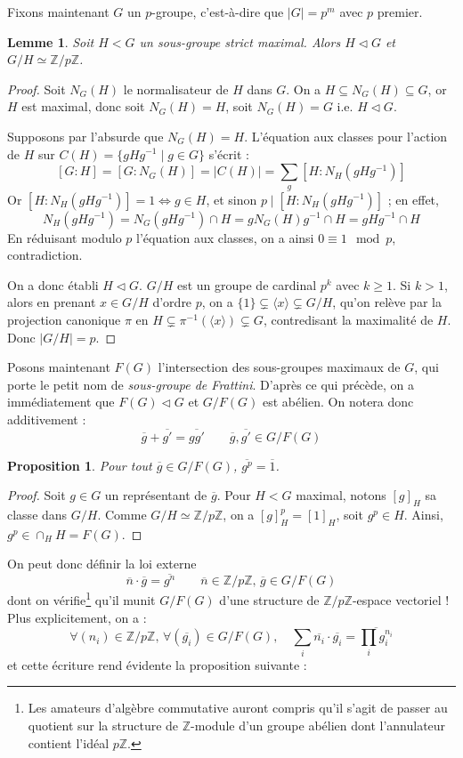 \documentclass[a4paper, 11pt]{article}
\def\Z{\mathbb{Z}}
\newtheorem*{proposition}{Proposition}
\newtheorem*{lemma}{Lemme}
\begin{document}
Fixons maintenant $G$ un $p$-groupe, c'est-à-dire que $|G| = p^m$ avec $p$
premier.

\begin{lemma}
  Soit $H < G$ un sous-groupe strict \emph{maximal}. Alors $H \triangleleft G$
  et $G/H \simeq \Z/p\Z$.
\end{lemma}
\begin{proof}
  Soit $N_G(H)$ le normalisateur de $H$ dans $G$. On a $H \subseteq N_G(H)
  \subseteq G$, or $H$ est maximal, donc soit $N_G(H) = H$, soit $N_G(H) = G$
  i.e. $H \triangleleft G$.

  Supposons par l'absurde que $N_G(H) = H$. L'équation aux classes pour l'action
  de $H$ sur $C(H) = \{gHg^{-1} \mid g \in G\}$ s'écrit :
  \[ [G : H] = [G : N_G(H)] = |C(H)| = \sum_g [H : N_H(gHg^{-1})] \]
  Or $[H : N_H(gHg^{-1})] = 1 \Leftrightarrow g \in H$, et sinon $p \mid [H :
  N_H(gHg^{-1})]$ ; en effet,
  \[ N_H(gHg^{-1}) = N_G(gHg^{-1}) \cap H = g N_G(H) g^{-1} \cap H = gHg^{-1}
  \cap H \]
  En réduisant modulo $p$ l'équation aux classes, on a ainsi $0 \equiv 1 \mod
  p$, contradiction.

  On a donc établi $H \triangleleft G$. $G/H$ est un groupe de cardinal $p^k$
  avec $k \geq 1$. Si $k > 1$, alors en prenant $x \in G/H$ d'ordre $p$, on a
  $\{1\} \subsetneq \langle x \rangle \subsetneq G/H$, qu'on relève par la
  projection canonique $\pi$ en $H \subsetneq \pi^{-1}(\langle x \rangle)
  \subsetneq G$, contredisant la maximalité de $H$. Donc $|G/H| = p$.
\end{proof}

Posons maintenant $F(G)$ l'intersection des sous-groupes maximaux de $G$,
qui porte le petit nom de \emph{sous-groupe de Frattini}.
D'après ce qui précède, on a immédiatement que $F(G) \triangleleft G$ et
$G/F(G)$ est abélien. On notera donc additivement :
\[ \overline{g} + \overline{g'} = \overline{gg'} \qquad
   \overline{g},\overline{g'} \in G/F(G) \]

\begin{proposition}
  Pour tout $\overline{g} \in G/F(G)$, $\overline{g^p} = \overline{1}$.
\end{proposition}
\begin{proof}
  Soit $g \in G$ un représentant de $\overline{g}$. Pour $H < G$ maximal, notons
  $[g]_H$ sa classe dans $G/H$. Comme $G/H \simeq \Z/p\Z$, on a $[g]_H^p =
  [1]_H$, soit $g^p \in H$. Ainsi, $g^p \in \cap_H H = F(G)$.
\end{proof}

On peut donc définir la loi externe
\[ \overline{n} \cdot \overline{g} = \overline{g^n} \qquad
  \overline{n} \in \Z/p\Z,\, \overline{g} \in G/F(G)
\]
dont on vérifie\footnote{Les amateurs d'algèbre commutative auront compris qu'il
  s'agit de passer au quotient sur la structure de $\Z$-module d'un groupe
  abélien dont l'annulateur contient l'idéal $p\Z$.} qu'il munit $G/F(G)$ d'une
structure de $\Z/p\Z$-espace vectoriel ! Plus explicitement, on a :
\[ \forall (n_i) \in \Z/p\Z,\, \forall (\overline{g_i}) \in G/F(G), \quad
  \sum_i \overline{n_i} \cdot \overline{g_i} = \overline{\prod_i g_i^{n_i}} \]
et cette écriture rend évidente la proposition suivante :
\end{document}
